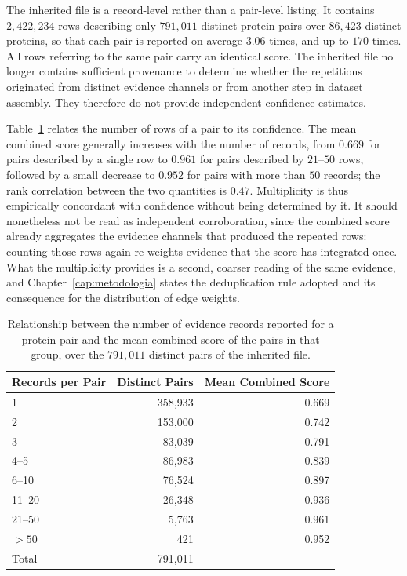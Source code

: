 \documentclass[Ingles]{ic-tese-v3}
\begin{document}
The inherited file is a record-level rather than a pair-level listing. It
contains $2{,}422{,}234$ rows describing only $791{,}011$ distinct protein pairs
over $86{,}423$ distinct proteins, so that each pair is reported on average
$3.06$ times, and up to $170$ times. All rows referring to the same pair carry an identical score. The inherited file no longer contains sufficient provenance to determine whether the repetitions originated from distinct evidence channels or from another step in dataset assembly. They therefore do not provide independent confidence estimates.

Table~\ref{tab:multiplicidade} relates the number of rows of a pair to its
confidence. The mean combined score generally increases with the number of records, from $0.669$ for pairs described by a single row to $0.961$ for pairs described by $21$--$50$ rows, followed by a small decrease to $0.952$ for pairs with more than $50$ records; the rank correlation between the two quantities is $0.47$. Multiplicity is thus empirically concordant with
confidence without being determined by it. It should nonetheless not be read as
independent corroboration, since the combined score already aggregates the
evidence channels that produced the repeated rows: counting those rows again
re-weights evidence that the score has integrated once. What the multiplicity
provides is a second, coarser reading of the same evidence, and
Chapter~\ref{cap:metodologia} states the deduplication rule adopted and its
consequence for the distribution of edge weights.

\begin{table}[!htb]
    \centering
    \caption{Relationship between the number of evidence records reported for a
    protein pair and the mean combined score of the pairs in that group, over the $791{,}011$
    distinct pairs of the inherited file.}
    \label{tab:multiplicidade}
    \begin{tabular}{lrr}
    \toprule
    Records per Pair & Distinct Pairs & Mean Combined Score \\
    \midrule
    1        & 358,933 & 0.669 \\
    2        & 153,000 & 0.742 \\
    3        &  83,039 & 0.791 \\
    4--5     &  86,983 & 0.839 \\
    6--10    &  76,524 & 0.897 \\
    11--20   &  26,348 & 0.936 \\
    21--50   &   5,763 & 0.961 \\
    $>50$    &     421 & 0.952 \\
    \midrule
    Total    & 791,011 &       \\
    \bottomrule
    \end{tabular}
\end{table}
\end{document}
